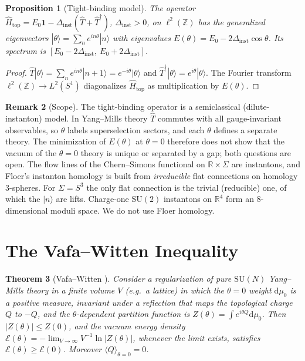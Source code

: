 \documentclass[11pt,a4paper]{amsart}
\newtheorem{theorem}{Theorem}[section]
\newtheorem{proposition}[theorem]{Proposition}
\theoremstyle{definition}
\newtheorem{remark}[theorem]{Remark}
\newcommand{\R}{\mathbb{R}}
\newcommand{\Z}{\mathbb{Z}}
\newcommand{\diff}{\mathrm{d}}
\begin{document}
\begin{proposition}[Tight-binding model]
\label{prop:tight_binding}
The operator $\hat H_{\mathrm{top}} = E_0\mathbf{1} - \Delta_{\mathrm{inst}}(\hat T + \hat T^\dagger)$, $\Delta_{\mathrm{inst}} > 0$, on $\ell^2(\Z)$ has the generalized eigenvectors $|\theta\rangle = \sum_n e^{in\theta}|n\rangle$ with eigenvalues $E(\theta) = E_0 - 2\Delta_{\mathrm{inst}}\cos\theta$. Its spectrum is $[E_0 - 2\Delta_{\mathrm{inst}},\ E_0 + 2\Delta_{\mathrm{inst}}]$.
\end{proposition}

\begin{proof}
$\hat T|\theta\rangle = \sum_n e^{in\theta}|n+1\rangle = e^{-i\theta}|\theta\rangle$ and $\hat T^\dagger|\theta\rangle = e^{i\theta}|\theta\rangle$. The Fourier transform $\ell^2(\Z)\to L^2(S^1)$ diagonalizes $\hat H_{\mathrm{top}}$ as multiplication by $E(\theta)$.
\end{proof}

\begin{remark}[Scope]
The tight-binding operator is a semiclassical (dilute-instanton) model. In Yang--Mills theory $\hat T$ commutes with all gauge-invariant observables, so $\theta$ labels superselection sectors, and each $\theta$ defines a separate theory. The minimization of $E(\theta)$ at $\theta = 0$ therefore does not show that the vacuum of the $\theta = 0$ theory is unique or separated by a gap; both questions are open. The flow lines of the Chern--Simons functional on $\R\times\Sigma$ are instantons, and Floer's instanton homology \cite{floer1988instanton} is built from \emph{irreducible} flat connections on homology $3$-spheres. For $\Sigma = S^3$ the only flat connection is the trivial (reducible) one, of which the $|n\rangle$ are lifts. Charge-one $\mathrm{SU}(2)$ instantons on $\R^4$ form an $8$-dimensional moduli space. We do not use Floer homology.
\end{remark}

\section{The Vafa--Witten Inequality}

\begin{theorem}[Vafa--Witten \cite{vafawitten1984}]
\label{thm:vafa_witten}
Consider a regularization of pure $\mathrm{SU}(N)$ Yang--Mills theory in a finite volume $V$ (e.g.\ a lattice) in which the $\theta = 0$ weight $\diff\mu_0$ is a positive measure, invariant under a reflection that maps the topological charge $Q$ to $-Q$, and the $\theta$-dependent partition function is $Z(\theta) = \int e^{i\theta Q}\diff\mu_0$. Then $|Z(\theta)| \le Z(0)$, and the vacuum energy density $\mathcal{E}(\theta) = -\lim_{V\to\infty}V^{-1}\ln|Z(\theta)|$, whenever the limit exists, satisfies $\mathcal{E}(\theta) \ge \mathcal{E}(0)$. Moreover $\langle Q\rangle_{\theta=0} = 0$.
\end{theorem}
\end{document}
